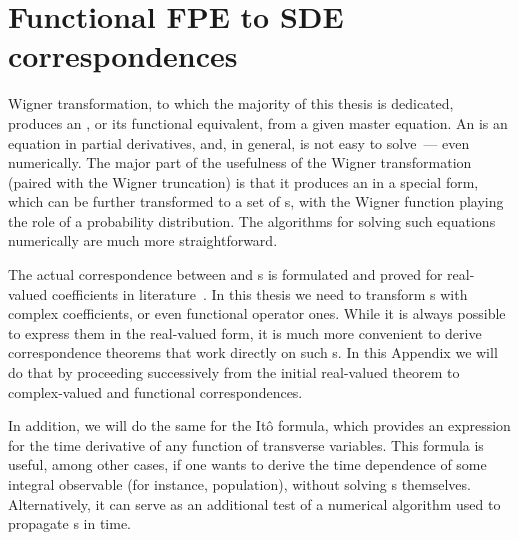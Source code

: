 \chapter{Functional FPE to SDE correspondences}
\label{cha:appendix:fpe-sde}

Wigner transformation, to which the majority of this thesis is dedicated, produces an , or its functional equivalent, from a given master equation.
An  is an equation in partial derivatives, and, in general, is not easy to solve~--- even numerically.
The major part of the usefulness of the Wigner transformation (paired with the Wigner truncation) is that it produces an  in a special form, which can be further transformed to a set of s, with the Wigner function playing the role of a probability distribution.
The algorithms for solving such equations numerically are much more straightforward.

The actual correspondence between  and s is formulated and proved for real-valued coefficients in literature~\cite{Risken1996}.
In this thesis we need to transform s with complex coefficients, or even functional operator ones.
While it is always possible to express them in the real-valued form, it is much more convenient to derive correspondence theorems that work directly on such s.
In this Appendix we will do that by proceeding successively from the initial real-valued theorem to complex-valued and functional correspondences.

In addition, we will do the same for the It\^o formula, which provides an expression for the time derivative of any function of transverse variables.
This formula is useful, among other cases, if one wants to derive the time dependence of some integral observable (for instance, population), without solving s themselves.
Alternatively, it can serve as an additional test of a numerical algorithm used to propagate s in time.



